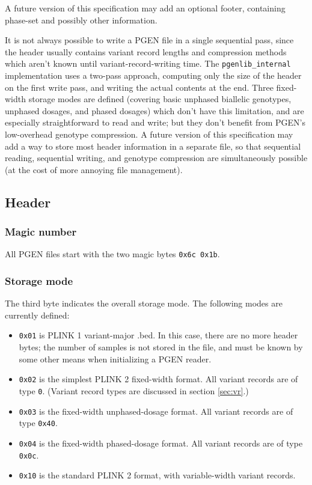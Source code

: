 \documentclass[8pt]{article}
\begin{document}
A future version of this specification may add an optional footer, containing
phase-set and possibly other information.

It is not always possible to write a PGEN file in a single sequential pass,
since the header usually contains variant record lengths and compression
methods which aren't known until variant-record-writing time.  The
\texttt{pgenlib\_internal} implementation uses a two-pass approach, computing
only the size of the header on the first write pass, and writing the actual
contents at the end.  Three fixed-width storage modes are defined (covering
basic unphased biallelic genotypes, unphased dosages, and phased dosages) which
don't have this limitation, and are especially straightforward to read and
write; but they don't benefit from PGEN's low-overhead genotype compression.  A
future version of this specification may add a way to store most header
information in a separate file, so that sequential reading, sequential writing,
and genotype compression are simultaneously possible (at the cost of more
annoying file management).

\subsection{Header}

\subsubsection{Magic number}

All PGEN files start with the two magic bytes \texttt{0x6c 0x1b}.

\subsubsection{Storage mode}

The third byte indicates the overall storage mode.  The following modes are
currently defined:

\begin{itemize}
  \itemsep0em
\item \texttt{0x01} is PLINK 1 variant-major .bed.  In this case, there are no
  more header bytes; the number of samples is not stored in the file, and must
  be known by some other means when initializing a PGEN reader.
\item \texttt{0x02} is the simplest PLINK 2 fixed-width format.  All variant
  records are of type \texttt{0}.  (Variant record types are discussed in
  section \ref{sec:vr}.)
\item \texttt{0x03} is the fixed-width unphased-dosage format.  All variant
  records are of type \texttt{0x40}.
\item \texttt{0x04} is the fixed-width phased-dosage format.  All variant
  records are of type \texttt{0x0c}.
\item \texttt{0x10} is the standard PLINK 2 format, with variable-width variant
  records.
\end{itemize}
\end{document}
